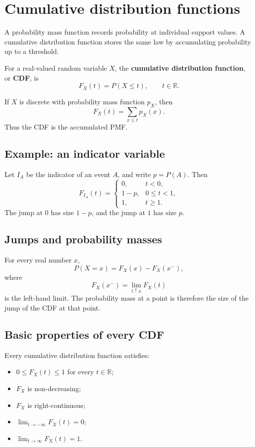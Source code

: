 \section{Cumulative distribution functions}

A probability mass function records probability at individual support values. A
cumulative distribution function stores the same law by accumulating probability
up to a threshold.

\begin{definitionbox}
For a real-valued random variable \(X\), the \textbf{cumulative distribution
function}, or \textbf{CDF}, is
\[
F_X(t)=P(X\leq t),
\qquad t\in\mathbb R.
\]
\end{definitionbox}

If \(X\) is discrete with probability mass function \(p_X\), then
\[
F_X(t)=\sum_{x\leq t}p_X(x).
\]
Thus the CDF is the accumulated PMF.

\subsection*{Example: an indicator variable}

Let \(I_A\) be the indicator of an event \(A\), and write \(p=P(A)\). Then
\[
F_{I_A}(t)=
\begin{cases}
0, & t<0,\\
1-p, & 0\leq t<1,\\
1, & t\geq1.
\end{cases}
\]
The jump at \(0\) has size \(1-p\), and the jump at \(1\) has size \(p\).

\subsection*{Jumps and probability masses}

For every real number \(x\),
\[
P(X=x)=F_X(x)-F_X(x^-),
\]
where
\[
F_X(x^-)=\lim_{t\uparrow x}F_X(t)
\]
is the left-hand limit. The probability mass at a point is therefore the size of
the jump of the CDF at that point.

\subsection*{Basic properties of every CDF}

Every cumulative distribution function satisfies:
\begin{itemize}
    \item \(0\leq F_X(t)\leq1\) for every \(t\in\mathbb R\);
    \item \(F_X\) is non-decreasing;
    \item \(F_X\) is right-continuous;
    \item \(\lim_{t\to-\infty}F_X(t)=0\);
    \item \(\lim_{t\to\infty}F_X(t)=1\).
\end{itemize}

